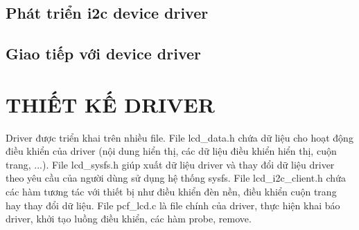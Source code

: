 \documentclass{report}
\begin{document}
\section{Phát triển \acrshort{i2c} device driver}


\section {Giao tiếp với device driver}

\chapter{THIẾT KẾ DRIVER}

Driver được triển khai trên nhiều file. File lcd\_data.h chứa dữ liệu cho hoạt động điều khiển của driver (nội dung hiển thị, các dữ liệu điều khiển hiển thị, cuộn trang, ...).  File lcd\_sysfs.h giúp xuất dữ liệu driver và thay đổi dữ liệu driver theo yêu cầu của người dùng sử dụng hệ thống sysfs. File lcd\_i2c\_client.h chứa các hàm tương tác với thiết bị như điều khiển đèn nền, điều khiển cuộn trang hay thay đổi dữ liệu. File pcf\_lcd.c là file chính của driver, thực hiện khai báo driver, khởi tạo luồng điều khiển, các hàm probe, remove.
\end{document}
